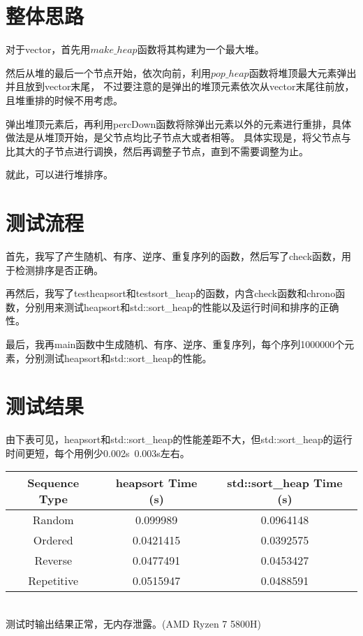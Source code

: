 \documentclass[UTF8]{ctexart}
\begin{document}
\pagestyle{fancy}
\fancyhead{}

\section{整体思路}
   对于vector，首先用$make\_heap$函数将其构建为一个最大堆。

   然后从堆的最后一个节点开始，依次向前，利用$pop\_heap$函数将堆顶最大元素弹出并且放到vector末尾，
   不过要注意的是弹出的堆顶元素依次从vector末尾往前放，且堆重排的时候不用考虑。

   弹出堆顶元素后，再利用percDown函数将除弹出元素以外的元素进行重排，具体做法是从堆顶开始，是父节点均比子节点大或者相等。
   具体实现是，将父节点与比其大的子节点进行调换，然后再调整子节点，直到不需要调整为止。

   就此，可以进行堆排序。

\section{测试流程}
首先，我写了产生随机、有序、逆序、重复序列的函数，然后写了check函数，用于检测排序是否正确。

再然后，我写了testheapsort和testsort\_heap的函数，内含check函数和chrono函数，分别用来测试heapsort和std::sort\_heap的性能以及运行时间和排序的正确性。

最后，我再main函数中生成随机、有序、逆序、重复序列，每个序列1000000个元素，分别测试heapsort和std::sort\_heap的性能。

\section{测试结果}   
由下表可见，heapsort和std::sort\_heap的性能差距不大，但std::sort\_heap的运行时间更短，每个用例少0.002s~0.003s左右。
\\
\begin{tabular}{|c|c|c|}
\hline
Sequence Type & heapsort Time (s) & std::sort\_heap Time (s) \\
\hline
Random & 0.099989 & 0.0964148 \\
Ordered & 0.0421415 & 0.0392575 \\
Reverse & 0.0477491 & 0.0453427 \\
Repetitive & 0.0515947 & 0.0488591 \\
\hline
\end{tabular}
    \\
测试时输出结果正常，无内存泄露。(AMD Ryzen 7 5800H)
\end{document}
